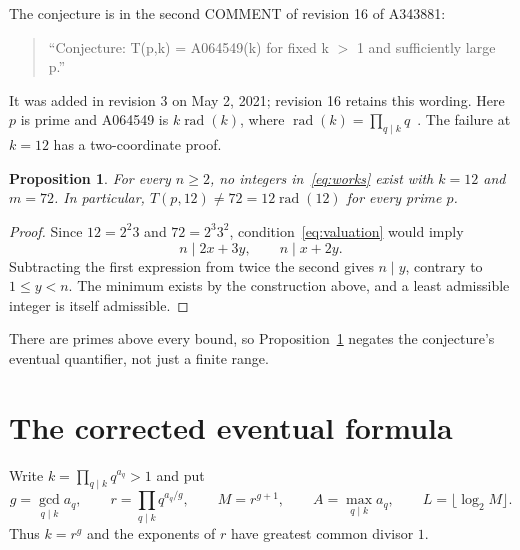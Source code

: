 \documentclass[11pt]{article}
\newtheorem{proposition}[theorem]{Proposition}
\DeclareMathOperator{\rad}{rad}
\begin{document}
The conjecture is in the second COMMENT of revision 16 of A343881:
\begin{quote}
``Conjecture: T(p,k) = A064549(k) for fixed k $>$ 1 and sufficiently large p.''
\end{quote}
It was added in revision 3 on May 2, 2021; revision 16 retains this wording.
Here $p$ is prime and A064549 is $k\rad(k)$, where
$\rad(k)=\prod_{q\mid k}q$~\cite{a064549}. The failure at $k=12$
has a two-coordinate proof.

\begin{proposition}\label{prop:obstruction}
For every $n\ge2$, no integers in~\eqref{eq:works} exist with
$k=12$ and $m=72$. In particular, $T(p,12)\ne72=12\rad(12)$ for
every prime $p$.
\end{proposition}
\begin{proof}
Since $12=2^2 3$ and $72=2^3 3^2$, condition~\eqref{eq:valuation}
would imply
\[
 n\mid 2x+3y,\qquad n\mid x+2y.
\]
Subtracting the first expression from twice the second gives $n\mid y$,
contrary to $1\le y<n$. The minimum exists by the construction above,
and a least admissible integer is itself admissible.
\end{proof}
There are primes above every bound, so Proposition~\ref{prop:obstruction}
negates the conjecture's eventual quantifier, not just a finite range.

\section{The corrected eventual formula}
Write $k=\prod_{q\mid k}q^{a_q}>1$ and put
\[
 g=\gcd_{q\mid k}a_q,\qquad r=\prod_{q\mid k}q^{a_q/g},\qquad
 M=r^{g+1},\qquad A=\max_{q\mid k}a_q,\qquad
 L=\lfloor\log_2 M\rfloor.
\]
Thus $k=r^g$ and the exponents of $r$ have greatest common divisor $1$.
\end{document}
